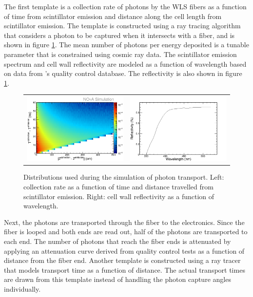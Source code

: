 The first template is a collection rate of photons by the WLS fibers as a function of time from scintillator emission and distance along the cell length from scintillator emission. The template is constructed using a ray tracing algorithm that considers a photon to be captured when it intersects with a fiber, and is shown in figure \ref{fig:SimPhoton}. The mean number of photons per energy deposited is a tunable parameter that is constrained using cosmic ray data. The scintillator emission spectrum and cell wall reflectivity are modeled as a function of wavelength based on data from \nova's quality control database. The reflectivity is also shown in figure \ref{fig:SimPhoton}.
\begin{figure}[htb]
  \centering
  \begin{tabular}{c c}
    \includegraphics[width=.47\textwidth]{figures/SimPhotonCaputre.png} &
    \includegraphics[width=.47\textwidth]{figures/SimWallReflectivity.png} \\
  \end{tabular}
  \caption[Simulation of Photon Transport]{Distributions used during the simulation of photon transport. Left: collection rate as a function of time and distance travelled from scintillator emission. Right: cell wall reflectivity as a function of wavelength.}
  \label{fig:SimPhoton}
\end{figure}

Next, the photons are transported through the fiber to the electronics. Since the fiber is looped and both ends are read out, half of the photons are transported to each end. The number of photons that reach the fiber ends is attenuated by applying an attenuation curve derived from quality control tests as a function of distance from the fiber end. Another template is constructed using a ray tracer that models transport time as a function of distance. The actual transport times are drawn from this template instead of handling the photon capture angles individually.

